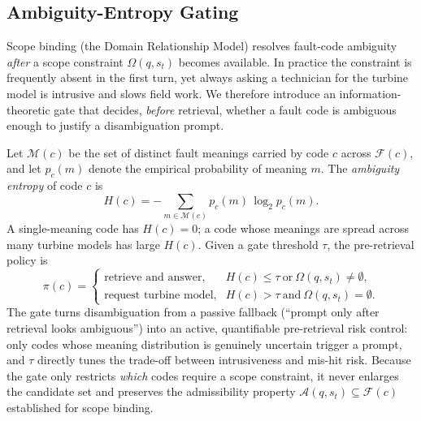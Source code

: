%

\subsection{Ambiguity-Entropy Gating}
\label{sec:aeg}
Scope binding (the Domain Relationship Model) resolves fault-code ambiguity \emph{after} a scope constraint $\Omega(q,s_t)$ becomes available. In practice the constraint is frequently absent in the first turn, yet always asking a technician for the turbine model is intrusive and slows field work. We therefore introduce an information-theoretic gate that decides, \emph{before} retrieval, whether a fault code is ambiguous enough to justify a disambiguation prompt.

Let $\mathcal{M}(c)$ be the set of distinct fault meanings carried by code $c$ across $\mathcal{F}(c)$, and let $p_c(m)$ denote the empirical probability of meaning $m$. The \emph{ambiguity entropy} of code $c$ is
\begin{equation}
H(c) = -\!\!\sum_{m\in\mathcal{M}(c)}\!\! p_c(m)\,\log_2 p_c(m).
\label{eq:aeg_entropy}
\end{equation}
A single-meaning code has $H(c)=0$; a code whose meanings are spread across many turbine models has large $H(c)$. Given a gate threshold $\tau$, the pre-retrieval policy is
\begin{equation}
\pi(c)=
\begin{cases}
\text{retrieve and answer}, & H(c)\le\tau \ \text{or}\ \Omega(q,s_t)\neq\emptyset,\\[2pt]
\text{request turbine model}, & H(c)>\tau \ \text{and}\ \Omega(q,s_t)=\emptyset.
\end{cases}
\label{eq:aeg_policy}
\end{equation}
The gate turns disambiguation from a passive fallback (``prompt only after retrieval looks ambiguous'') into an active, quantifiable pre-retrieval risk control: only codes whose meaning distribution is genuinely uncertain trigger a prompt, and $\tau$ directly tunes the trade-off between intrusiveness and mis-hit risk. Because the gate only restricts \emph{which} codes require a scope constraint, it never enlarges the candidate set and preserves the admissibility property $\mathcal{A}(q,s_t)\subseteq\mathcal{F}(c)$ established for scope binding.

